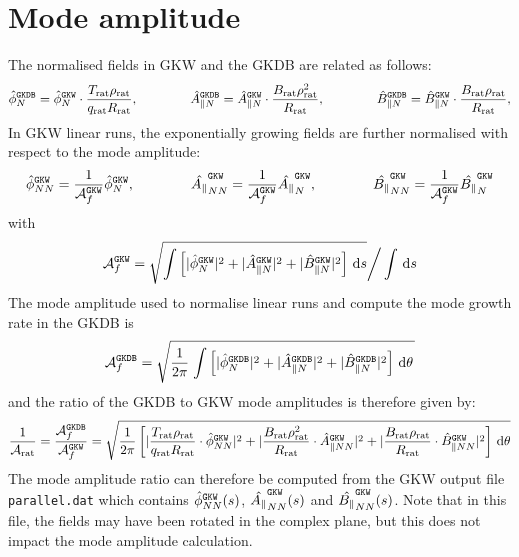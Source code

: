 \documentclass[a4paper]{report}
\begin{document}
\section{Mode amplitude}
The normalised fields in GKW and the GKDB are related as follows:
\begin{equation}
\hat{\phi}_N^{\texttt{GKDB}} = \hat{\phi}_N^{\texttt{GKW}}\cdot\frac{T_\textrm{rat}\rho_\textrm{rat}}{q_\textrm{rat}R_\textrm{rat}}, \qquad \qquad
\hat{A}_{\parallel N}^{\texttt{GKDB}} = \hat{A}_{\parallel N}^{\texttt{GKW}}\cdot\frac{B_\textrm{rat}\rho_\textrm{rat}^2}{R_\textrm{rat}}, \qquad \qquad 
\hat{B}_{\parallel N}^{\texttt{GKDB}} = \hat{B}_{\parallel N}^{\texttt{GKW}}\cdot\frac{B_\textrm{rat}\rho_\textrm{rat}}{R_\textrm{rat}},  
\end{equation}
In GKW linear runs, the exponentially growing fields are further normalised with respect to the mode amplitude:
\begin{equation}
\hat{\phi}_{NN}^{\texttt{GKW}} = \frac{1}{\mathcal{A}_f^{\texttt{GKW}}}\hat{\phi}_N^{\texttt{GKW}},  \qquad \qquad \hat{A_\parallel}_{NN}^{\texttt{GKW}} = \frac{1}{\mathcal{A}_f^{\texttt{GKW}}}\hat{A_\parallel}_N^{\texttt{GKW}},  \qquad \qquad \hat{B_\parallel}_{NN}^{\texttt{GKW}} = \frac{1}{\mathcal{A}_f^{\texttt{GKW}}}\hat{B_\parallel}_N^{\texttt{GKW}}
\end{equation}
with
\begin{equation}
\mathcal{A}_f^{\texttt{GKW}} = \sqrt{\int \left[|\hat{\phi}_N^{\texttt{GKW}}|^2 + |\hat{A}_{\parallel N}^{\texttt{GKW}}|^2+|\hat{B}_{\parallel N}^{\texttt{GKW}}|^2\right] \,\textrm{d}s} \bigg/ \int \,\textrm{d}s
\end{equation}
The mode amplitude used to normalise linear runs and compute the mode growth rate in the GKDB is 
\begin{equation}
\mathcal{A}_f^{\texttt{GKDB}}  = \sqrt{\frac{1}{2\pi}\left.\int \left[|\hat{\phi}_N^{\texttt{GKDB}}|^2 + |\hat{A}_{\parallel N}^{\texttt{GKDB}}|^2  + |\hat{B}_{\parallel N}^{\texttt{GKDB}}|^2\right] \,\textrm{d}\theta \right.}
\end{equation}
and the ratio of the GKDB to GKW mode amplitudes is therefore given by:
\begin{equation}
\frac{1}{\mathcal{A}_\textrm{rat}} = \frac{\mathcal{A}_f^{\texttt{GKDB}}}{\mathcal{A}_f^{\texttt{GKW}}} = \sqrt{\frac{1}{2\pi}\left[ |\frac{T_\textrm{rat}\rho_\textrm{rat}}{q_\textrm{rat}R_\textrm{rat}}\cdot\hat{\phi}_{NN}^{\texttt{GKW}}|^2 + |\frac{B_\textrm{rat}\rho_\textrm{rat}^2}{R_\textrm{rat}}\cdot\hat{A}_{\parallel NN}^{\texttt{GKW}}|^2+|\frac{B_\textrm{rat}\rho_\textrm{rat}}{R_\textrm{rat}}\cdot\hat{B}_{\parallel NN}^{\texttt{GKW}}|^2\right]\,\textrm{d}\theta }
\end{equation}
The mode amplitude ratio can therefore be computed from the GKW output file \texttt{parallel.dat} which contains $\hat{\phi}_{NN}^{\texttt{GKW}}(s)$, $\hat{A_\parallel}_{NN}^{\texttt{GKW}}(s)$ and $\hat{B_\parallel}_{NN}^{\texttt{GKW}}(s)$. Note that in this file, the fields may have been rotated in the complex plane, but this does not impact the mode amplitude calculation.
\end{document}
